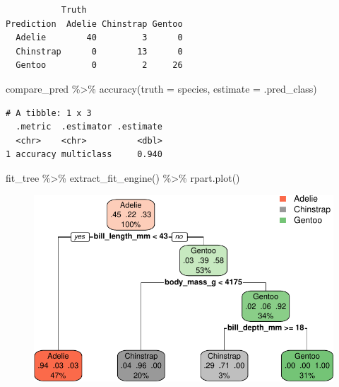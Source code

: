 \documentclass[
  letterpaper,
  DIV=11,
  numbers=noendperiod]{scrreprt}
\newenvironment{Shaded}{\begin{snugshade}}{\end{snugshade}}
\newcommand{\AttributeTok}[1]{\textcolor[rgb]{0.40,0.45,0.13}{#1}}
\newcommand{\FunctionTok}[1]{\textcolor[rgb]{0.28,0.35,0.67}{#1}}
\newcommand{\NormalTok}[1]{\textcolor[rgb]{0.00,0.23,0.31}{#1}}
\newcommand{\SpecialCharTok}[1]{\textcolor[rgb]{0.37,0.37,0.37}{#1}}
\begin{document}
\begin{verbatim}
           Truth
Prediction  Adelie Chinstrap Gentoo
  Adelie        40         3      0
  Chinstrap      0        13      0
  Gentoo         0         2     26
\end{verbatim}

\begin{Shaded}
\begin{Highlighting}[]
\NormalTok{compare\_pred }\SpecialCharTok{\%\textgreater{}\%}  \FunctionTok{accuracy}\NormalTok{(}\AttributeTok{truth =}\NormalTok{ species, }\AttributeTok{estimate =}\NormalTok{ .pred\_class)}
\end{Highlighting}
\end{Shaded}

\begin{verbatim}
# A tibble: 1 x 3
  .metric  .estimator .estimate
  <chr>    <chr>          <dbl>
1 accuracy multiclass     0.940
\end{verbatim}

\begin{Shaded}
\begin{Highlighting}[]
\NormalTok{fit\_tree }\SpecialCharTok{\%\textgreater{}\%}
  \FunctionTok{extract\_fit\_engine}\NormalTok{() }\SpecialCharTok{\%\textgreater{}\%}
  \FunctionTok{rpart.plot}\NormalTok{()}
\end{Highlighting}
\end{Shaded}

\begin{figure}[H]

{\centering \includegraphics{./14-machine-learning_files/figure-pdf/unnamed-chunk-10-1.pdf}

}

\end{figure}
\end{document}
